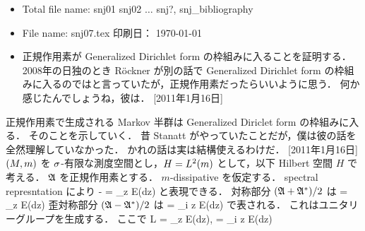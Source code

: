 %
\StartNewSection
\hide
\vspace{-4mm}
\begin{itemize} \itemsep=-2mm \parsep=0mm
\item Total file name: snj01 snj02 $\dots $ snj?, snj\_bibliography
\item File name: snj07.tex \hfill 印刷日： \today \ \now
\item 正規作用素が Generalized Dirichlet form の枠組みに入ることを証明する．
2008年の日独のとき R\"ockner が別の話で Generalized Dirichlet form
の枠組みに入るのではと言っていたが，正規作用素だったらいいように思う．
何か感じたんでしょうね，彼は．
[2011年1月16日]
\end{itemize}
\endhide
{} %
正規作用素で生成される Markov 半群は Generalized Diriclet form
の枠組みに入る．
そのことを示していく．
\hide
昔 Stanatt がやっていたことだが，僕は彼の話を全然理解していなかった．
かれの話は実は結構使えるわけだ．
[2011年1月16日]
\endhide
$(M,m)$ を $\sigma$-有限な測度空間とし，$H=L^2(m)$ として，以下 Hilbert 空間
$H$ で考える．
${\mathfrak A}$ を正規作用素とする．
$m$-dissipative を仮定する．
spectral represntation により
\bdn %
- \gen
= \int_\C z E(dz)
\edn %
と表現できる．
対称部分 $({\mathfrak A}+{\mathfrak A}^*)/2$ は
\bdn %
= \int_\C \Re z E(dz)
\edn %
歪対称部分 $({\mathfrak A}-{\mathfrak A}^*)/2$ は
\bdn %
= \int_\C i \Im z E(dz)
\edn %
で表される．
これはユニタリーグループを生成する．
ここで
\bdn %
L
= \int_\C \Re z E(dz),\quad
\Lm
= \int_\C i \Im z E(dz)
\edn %
